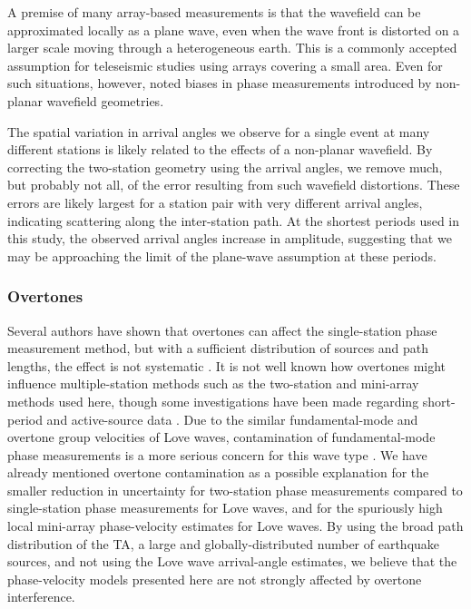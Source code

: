 \documentclass[12pt,oneside]{book}
\begin{document}
A premise of many array-based measurements is that the wavefield can be approximated locally as a plane wave, even when the wave front is distorted on a larger scale moving through a heterogeneous earth. This is a commonly accepted assumption for teleseismic studies using arrays covering a small area. Even for such situations, however, \citet{Wielandt1993} noted biases in phase measurements introduced by non-planar wavefield geometries. 

The spatial variation in arrival angles we observe for a single event at many different stations is likely related to the effects of a non-planar wavefield. By correcting the two-station geometry using the arrival angles, we remove much, but probably not all, of the error resulting from such wavefield distortions. These errors are likely largest for a station pair with very different arrival angles, indicating scattering along the inter-station path. At the shortest periods used in this study, the observed arrival angles increase in amplitude, suggesting that we may be approaching the limit of the plane-wave assumption at these periods. 

\subsubsection*{Overtones}

Several authors have shown that overtones can affect the single-station phase measurement method, but with a sufficient distribution of sources and path lengths, the effect is not systematic \citep{Boore1969,Forsyth1975,Nakanishi&Anderson1983,Nettles2011}. It is not well known how overtones might influence multiple-station methods such as the two-station and mini-array methods used here, though some investigations have been made regarding short-period and active-source data \citep[e.g.,][]{Forbriger2003, Kimman2011}. Due to the similar fundamental-mode and overtone group velocities of Love waves, contamination of fundamental-mode phase measurements is a more serious concern for this wave type \citep[e.g.,][]{Nettles2011}. We have already mentioned overtone contamination as a possible explanation for the smaller reduction in uncertainty for two-station phase measurements compared to single-station phase measurements for Love waves, and for the spuriously high local mini-array phase-velocity estimates for Love waves. By using the broad path distribution of the TA, a large and globally-distributed number of earthquake sources, and not using the Love wave arrival-angle estimates, we believe that the phase-velocity models presented here are not strongly affected by overtone interference. 
\end{document}
